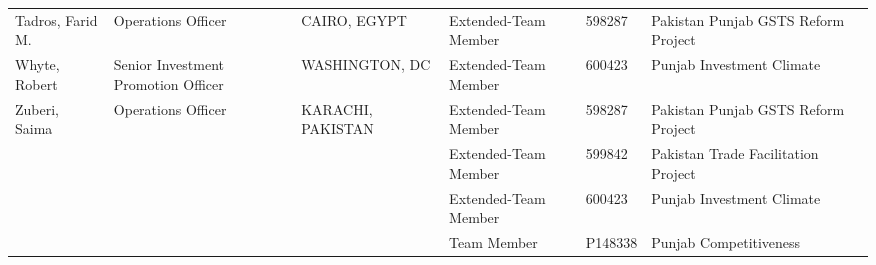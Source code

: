 \documentclass{article}\usepackage[]{graphicx}\usepackage[]{color}
\begin{document}
\begin{minipage}[b]{0.99\textwidth}
{\begin{longtable}{>{\raggedright}p{1.4in}>{\raggedright}p{1in}>{\raggedright}p{1in}>{\raggedright}p{1in}l>{\raggedright}p{1.5in}l}
  Tadros, Farid M. & Operations Officer & CAIRO, EGYPT & Extended-Team Member & 598287 & Pakistan Punjab GSTS Reform Project &  \\ 
  Whyte, Robert & Senior Investment Promotion Officer & WASHINGTON, DC & Extended-Team Member & 600423 & Punjab Investment Climate &  \\ 
  Zuberi, Saima & Operations Officer & KARACHI, PAKISTAN & Extended-Team Member & 598287 & Pakistan Punjab GSTS Reform Project &  \\ 
   &  &  & Extended-Team Member & 599842 & Pakistan Trade Facilitation Project &  \\ 
   &  &  & Extended-Team Member & 600423 & Punjab Investment Climate &  \\ 
   &  &  & Team Member & P148338 & Punjab Competitiveness &  \\ 
  \hline
\end{longtable}
}

     \vspace*{0.5cm}
\end{minipage}

\end{document}
